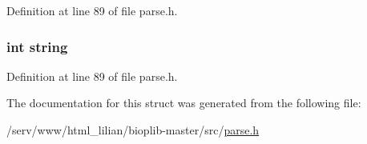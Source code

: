 Definition at line 89 of file parse.\-h.

\hypertarget{struct_key_wd_a6173b7d8f1e6927813745d72ea5bed19}{
\subsubsection[{string}]{\setlength{\rightskip}{0pt plus 5cm}int string}}\label{struct_key_wd_a6173b7d8f1e6927813745d72ea5bed19}


Definition at line 89 of file parse.\-h.



The documentation for this struct was generated from the following file\-:\begin{DoxyCompactItemize}
\item 
/serv/www/html\-\_\-lilian/bioplib-\/master/src/\hyperlink{parse_8h}{parse.\-h}\end{DoxyCompactItemize}
